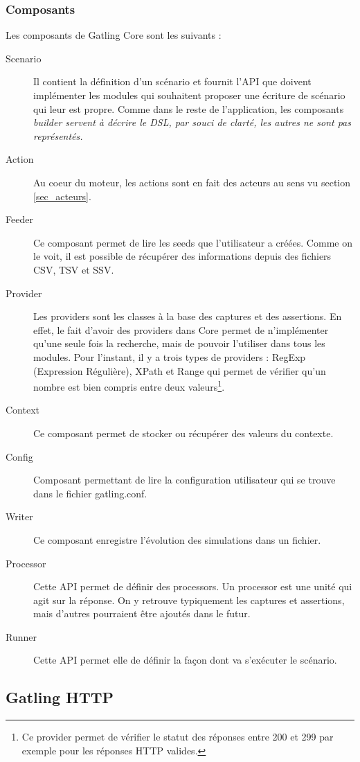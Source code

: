 \subsubsection{Composants}
\label{sec_core_comp}
Les composants de Gatling Core sont les suivants :
\begin{description}
\item[Scenario] Il contient la définition d'un scénario et fournit l'API que doivent implémenter les modules qui souhaitent proposer une écriture de scénario qui leur est propre. Comme dans le reste de l'application, les composants \em{builder} servent à décrire le DSL, par souci de clarté, les autres ne sont pas représentés.
\item[Action] Au coeur du moteur, les actions sont en fait des acteurs au sens vu section \ref{sec_acteurs}.
\item[Feeder] Ce composant permet de lire les seeds que l'utilisateur a créées. Comme on le voit, il est possible de récupérer des informations depuis des fichiers CSV, TSV et SSV.
\item[Provider] Les providers sont les classes à la base des captures et des assertions. En effet, le fait d'avoir des providers dans Core permet de n'implémenter qu'une seule fois la recherche, mais de pouvoir l'utiliser dans tous les modules. Pour l'instant, il y a trois types de providers : RegExp (Expression Régulière), XPath et Range qui permet de vérifier qu'un nombre est bien compris entre deux valeurs\footnote{Ce provider permet de vérifier le statut des réponses entre 200 et 299 par exemple pour les réponses HTTP valides.}.
\item[Context] Ce composant permet de stocker ou récupérer des valeurs du contexte.
\item[Config] Composant permettant de lire la configuration utilisateur qui se trouve dans le fichier gatling.conf.
\item[Writer] Ce composant enregistre l'évolution des simulations dans un fichier.
\item[Processor] Cette API permet de définir des processors. Un processor est une unité qui agit sur la réponse. On y retrouve typiquement les captures et assertions, mais d'autres pourraient être ajoutés dans le futur.
\item[Runner] Cette API permet elle de définir la façon dont va s'exécuter le scénario.
\end{description}

\subsection{Gatling HTTP}

